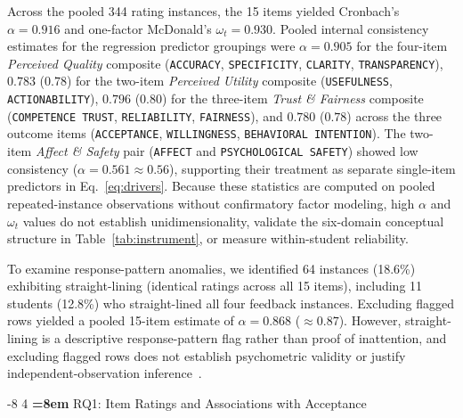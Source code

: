 \documentclass{llncs}
\makeatletter
\renewcommand\subsection{\@startsection{subsection}{2}{\z@}%
                       {-8\p@ \@plus -2\p@ \@minus -2\p@}%
                       {4\p@ \@plus 1\p@ \@minus 1\p@}%
                       {\normalfont\normalsize\bfseries\boldmath
                        \rightskip=\z@ \@plus 8em\pretolerance=10000 }}
\makeatother
\begin{document}
Across the pooled 344 rating instances, the 15 items yielded Cronbach's $\alpha = 0.916$ and one-factor McDonald's $\omega_t = 0.930$. Pooled internal consistency estimates for the regression predictor groupings were $\alpha = 0.905$ for the four-item \emph{Perceived Quality} composite (\texttt{ACCURACY}, \texttt{SPECIFICITY}, \texttt{CLARITY}, \texttt{TRANSPARENCY}), $0.783$ ($0.78$) for the two-item \emph{Perceived Utility} composite (\texttt{USEFULNESS}, \texttt{ACTIONABILITY}), $0.796$ ($0.80$) for the three-item \emph{Trust \& Fairness} composite (\texttt{COMPETENCE TRUST}, \texttt{RELIABILITY}, \texttt{FAIRNESS}), and $0.780$ ($0.78$) across the three outcome items (\texttt{ACCEPTANCE}, \texttt{WILLINGNESS}, \texttt{BEHAVIORAL INTENTION}). The two-item \emph{Affect \& Safety} pair (\texttt{AFFECT} and \texttt{PSYCHOLOGICAL SAFETY}) showed low consistency ($\alpha = 0.561 \approx 0.56$), supporting their treatment as separate single-item predictors in Eq.~\ref{eq:drivers}. Because these statistics are computed on pooled repeated-instance observations without confirmatory factor modeling, high $\alpha$ and $\omega_t$ values do not establish unidimensionality, validate the six-domain conceptual structure in Table~\ref{tab:instrument}, or measure within-student reliability.

To examine response-pattern anomalies, we identified 64 instances (18.6\%) exhibiting straight-lining (identical ratings across all 15 items), including 11 students (12.8\%) who straight-lined all four feedback instances. Excluding flagged rows yielded a pooled 15-item estimate of $\alpha = 0.868$ ($\approx 0.87$). However, straight-lining is a descriptive response-pattern flag rather than proof of inattention, and excluding flagged rows does not establish psychometric validity or justify independent-observation inference~\cite{kim2019straightlining,vansonderen2013ineffectiveness}.

\subsection{RQ1: Item Ratings and Associations with Acceptance}
\end{document}
